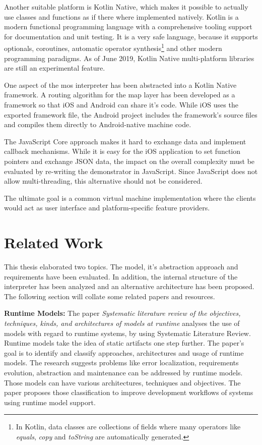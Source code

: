Another suitable platform is Kotlin Native, which makes it possible to actually use classes and functions as if there where implemented natively.
Kotlin is a modern functional programming language with a comprehensive tooling support for documentation and unit testing.
It is a very safe language, because it supports optionals, coroutines, automatic operator synthesis\footnote{In Kotlin, data classes are collections of fields where many operators like \textit{equals}, \textit{copy} and \textit{toString} are automatically generated.} and other modern programming paradigms.
As of June 2019, Kotlin Native multi-platform libraries are still an experimental feature.

One aspect of the mos interpreter has been abstracted into a Kotlin Native framework.
A routing algorithm for the map layer has been developed as a framework so that iOS and Android can share it's code.
While iOS uses the exported framework file, the Android project includes the framework's source files and compiles them directly to Android-native machine code.

The JavaScript Core approach makes it hard to exchange data and implement callback mechanisms.
While it is easy for the iOS application to set function pointers and exchange \ac{JSON} data, the impact on the overall complexity must be evaluated by re-writing the demonstrator in JavaScript.
Since JavaScript does not allow multi-threading, this alternative should not be considered.

The ultimate goal is a common virtual machine implementation where the clients would act as user interface and platform-specific feature providers.

\section{Related Work}

This thesis elaborated two topics.
The model, it's abstraction approach and requirements have been evaluated.
In addition, the internal structure of the interpreter has been analyzed and an alternative architecture has been proposed.
The following section will collate some related papers and resources.

\textbf{Runtime Models:} The paper \textit{Systematic literature review of the objectives, techniques, kinds, and architectures of models at runtime} \cite{szvetits_systematic_2013} analyses the use of models with regard to runtime systems, by using Systematic Literature Review.
Runtime models take the idea of static artifacts one step further.
The paper's goal is to identify and classify approaches, architectures and usage of runtime models.
The research suggests problems like error localization, requirements evolution, abstraction and maintenance can be addressed by runtime models.
Those models can have various architectures, techniques and objectives.
The paper proposes those classification to improve development workflows of systems using runtime model support.

